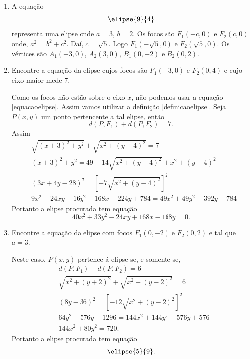 \begin{exemplos}
  \begin{enumerate}
    \item A equação
    \[
      \elipse{9}{4}
    \]
    representa uma elipse onde $a = 3$, $b = 2$. Os focos são $F_1(-c,0)$ e $F_2(c,0)$ onde, $a^2 = b^2 + c^2$. Daí, $c = \sqrt{5}$. Logo $F_1(-\sqrt{5},0)$ e $F_2(\sqrt{5},0)$. Os vértices são $A_1(-3,0)$, $A_2(3,0)$, $B_1(0,-2)$ e $B_2(0,2)$.
    \item Encontre a equação da elipse cujos focos são $F_1(-3,0)$ e $F_2(0,4)$ e cujo eixo maior mede 7.
    \begin{solucao}
      Como os focos não estão sobre o eixo $x$, não podemos usar a equação \eqref{equacaoelipse}. Assim vamos utilizar a definição \eqref{definicaoelipse}. Seja $P(x,y)$ um ponto pertencente a tal elipse, então
      \[
        d(P,F_1) + d(P,F_2) = 7.
      \]
      Assim
      \begin{align*}
        &\sqrt{(x + 3)^2 + y^2} + \sqrt{x^2 + (y - 4)^2} = 7\\
        &(x+ 3)^2 + y^2 = 49 - 14\sqrt{x^2 + (y - 4)^2} + x^2 + (y - 4)^2\\
        &(3x + 4y - 28)^2 = \left[-7\sqrt{x^2 + (y - 4)^2}\right]^2\\
        &9x^2 + 24xy + 16y^2 - 168x - 224y + 784 = 49x^2 + 49y^2 - 392y + 784
      \end{align*}
      Portanto a elipse procurada tem equação
      \[
        40x^2 + 33y^2 - 24xy + 168x - 168y = 0.
      \]
    \end{solucao}
    \item Encontre a equação da elipse com focos $F_1(0,-2)$ e $F_2(0,2)$ e tal que $a = 3$.
    \begin{solucao}
      Neste caso, $P(x,y)$ pertence á elipse se, e somente se,
      \begin{align*}
        &d(P,F_1) + d(P,F_2) = 6\\
        &\sqrt{x^2 + (y + 2)^2} + \sqrt{x^2 + (y - 2)^2} = 6\\
        &(8y - 36)^2 = \left[-12\sqrt{x^2 + (y - 2)^2}\right]^2\\
        &64y^2 - 576y + 1296 = 144x^2 + 144y^2 - 576y + 576\\
        &144x^2 + 80y^2 = 720.
      \end{align*}
      Portanto a elipse procurada tem equação
      \[
        \elipse{5}{9}.
      \]
    \end{solucao}
  \end{enumerate}
\end{exemplos}

